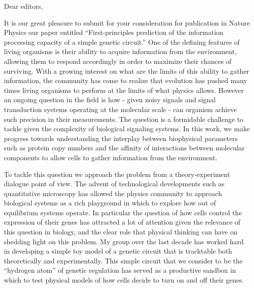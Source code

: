 




\date{\today}



Dear editors,

It is our great pleasure to submit for your consideration for publication in
Nature Physics our paper entitled ``First-principles prediction of the
information processing capacity of a simple genetic circuit.'' One of the
defining features of living organisms is their ability to acquire information
from the environment, allowing them to respond accordingly in order to maximize
their chances of surviving. With a growing interest on what are the limits of
this ability to gather information, the community has come to realize that
evolution has pushed many times living organisms to perform at the limits of
what physics allows. However an ongoing question in the field is how - given
noisy signals and signal transduction systems operating at the molecular scale -
can organism achieve such precision in their measurements. The question is a
formidable challenge to tackle given the complexity of biological signaling
systems. In this work, we make progress towards understanding the interplay
between biophysical parameters such as protein copy numbers and the affinity of
interactions between molecular components to allow cells to gather information
from the environment.

To tackle this question we approach the problem from a theory-experiment
dialogue point of view. The advent of technological developments such as
quantitative microscopy has allowed the physics community to approach biological
systems as a rich playground in which to explore how out of equilibrium systems
operate. In particular the question of how cells control the expression of their
genes has attracted a lot of attention given the relevance of this question in
biology, and the clear role that physical thinking can have on shedding light on
this problem. My group over the last decade has worked hard in developing a
simple toy model of a genetic circuit that is tracktable both theoretically and
experimentally. This simple circuit that we consider to be the ``hydrogen atom''
of genetic regulation has served as a productive sandbox in which to test
physical models of how cells decide to turn on and off their genes.

